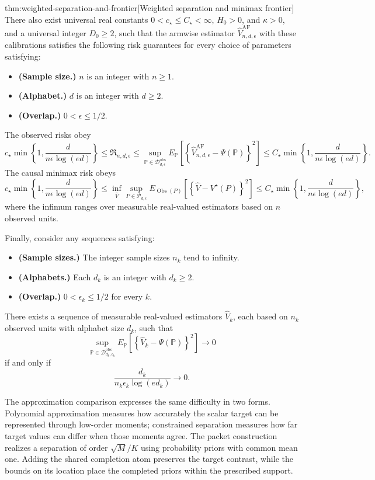 \documentclass[11pt]{article}
\begin{document}
\begin{theoremv}{thm:weighted-separation-and-frontier}[Weighted separation and minimax frontier]
There also exist universal real constants
\(0<c_\star\leq C_\star<\infty\), \(H_0>0\), and \(\kappa>0\), and a universal integer \(D_0\geq2\), such that the armwise estimator
\(\widehat V_{n,d,\epsilon}^{\mathrm{AF}}\) with these calibrations satisfies the following risk guarantees for every choice of parameters satisfying:
\begin{itemize}
\item \textbf{(Sample size.)} \(n\) is an integer with \(n\geq1\).
\item \textbf{(Alphabet.)} \(d\) is an integer with \(d\geq2\).
\item \textbf{(Overlap.)} \(0<\epsilon\leq1/2\).
\end{itemize}
The observed risks obey
\[
c_\star\min\left\{1,\frac{d}{n\epsilon\log(ed)}\right\}
\leq \mathfrak R_{n,d,\epsilon}
\leq
\sup_{\mathbb P\in\mathcal D_{d,\epsilon}^{\mathrm{obs}}}
E_{\mathbb P}\!\left[
\left\{\widehat V_{n,d,\epsilon}^{\mathrm{AF}}
-\Psi(\mathbb P)\right\}^2
\right]
\leq
C_\star\min\left\{1,\frac{d}{n\epsilon\log(ed)}\right\}.
\]
The causal minimax risk obeys
\[
c_\star\min\left\{1,\frac{d}{n\epsilon\log(ed)}\right\}
\leq
\inf_{\widehat V}
\sup_{P\in\mathcal P_{d,\epsilon}}
E_{\operatorname{Obs}(P)}\!\left[
\left\{\widehat V-V^\star(P)\right\}^2
\right]
\leq
C_\star\min\left\{1,\frac{d}{n\epsilon\log(ed)}\right\},
\]
where the infimum ranges over measurable real-valued estimators based on \(n\) observed units.

Finally, consider any sequences satisfying:
\begin{itemize}
\item \textbf{(Sample sizes.)} The integer sample sizes \(n_k\) tend to infinity.
\item \textbf{(Alphabets.)} Each \(d_k\) is an integer with \(d_k\geq2\).
\item \textbf{(Overlap.)} \(0<\epsilon_k\leq1/2\) for every \(k\).
\end{itemize}
There exists a sequence of measurable real-valued estimators
\(\widehat V_k\), each based on \(n_k\) observed units with alphabet size \(d_k\), such that
\[
\sup_{\mathbb P\in\mathcal D_{d_k,\epsilon_k}^{\mathrm{obs}}}
E_{\mathbb P}\!\left[
\left\{\widehat V_k-\Psi(\mathbb P)\right\}^2
\right]\longrightarrow0
\]
if and only if
\[
\frac{d_k}{n_k\epsilon_k\log(ed_k)}\longrightarrow0.
\]
\end{theoremv}

The approximation comparison expresses the same difficulty in two forms. Polynomial approximation measures how accurately the scalar target can be represented through low-order moments; constrained separation measures how far target values can differ when those moments agree. The packet construction realizes a separation of order \(\sqrt M/K\) using probability priors with common mean one. Adding the shared completion atom preserves the target contrast, while the bounds on its location place the completed priors within the prescribed support.
\end{document}
